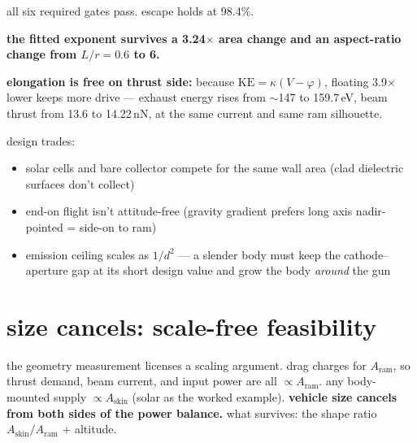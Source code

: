 \documentclass[11pt]{article}
\begin{document}
all six required gates pass.  escape holds at 98.4\%.

\textbf{the fitted exponent survives a 3.24$\times$ area change and an
aspect-ratio change from $L/r = 0.6$ to 6.}

\medskip
\textbf{elongation is free on thrust side:} because $\mathrm{KE} =
\kappa(V-\varphi)$, floating 3.9$\times$ lower keeps more drive --- exhaust
energy rises from $\sim$147 to 159.7\,eV, beam thrust from 13.6 to 14.22\,nN,
at the same current and same ram silhouette.

\medskip
design trades:
\begin{itemize}
  \item solar cells and bare collector compete for the same wall area (clad
        dielectric surfaces don't collect)
  \item end-on flight isn't attitude-free (gravity gradient prefers long axis
        nadir-pointed = side-on to ram)
  \item emission ceiling scales as $1/d^2$ --- a slender body must keep the
        cathode--aperture gap at its short design value and grow the body
        \emph{around} the gun
\end{itemize}

\section{size cancels: scale-free feasibility}

the geometry measurement licenses a scaling argument.  drag charges for
$A_{\mathrm{ram}}$, so thrust demand, beam current, and input power are all
$\propto A_{\mathrm{ram}}$.  any body-mounted supply
$\propto A_{\mathrm{skin}}$ (solar as the worked example).
\textbf{vehicle size cancels from both sides of the power balance.}  what
survives: the shape ratio $A_{\mathrm{skin}}/A_{\mathrm{ram}}$ + altitude.
\end{document}
